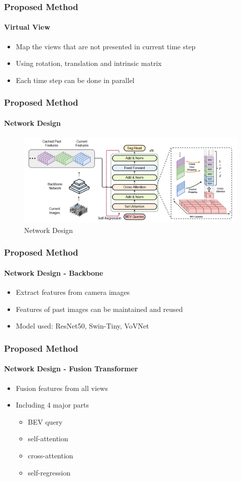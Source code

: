 \documentclass[
	12pt, %
	aspectratio=169, %
]{beamer}
\begin{document}
\begin{frame}
	\frametitle{Proposed Method}
	\framesubtitle{Virtual View}

	\begin{itemize}
		\item Map the views that are not presented in current time step
		\item Using rotation, translation and intrinsic matrix
		\item Each time step can be done in parallel
	\end{itemize}
\end{frame}

\begin{frame}
	\frametitle{Proposed Method}
	\framesubtitle{Network Design}

	\begin{figure}
		\centering
		\includegraphics[width=0.9\linewidth]{"./Images/network_design.png"}
		\caption{Network Design}
	\end{figure}
\end{frame}

\begin{frame}
	\frametitle{Proposed Method}
	\framesubtitle{Network Design - Backbone}

	\begin{itemize}
		\item Extract features from camera images
		\item Features of past images can be maintained and reused
		\item Model used: ResNet50, Swin-Tiny, VoVNet
	\end{itemize}
\end{frame}

\begin{frame}
	\frametitle{Proposed Method}
	\framesubtitle{Network Design - Fusion Transformer}

	\begin{itemize}
		\item Fusion features from all views
		\item Including 4 major parts
		\begin{itemize}
			\item BEV query
			\item self-attention
			\item cross-attention
			\item self-regression
		\end{itemize}
	\end{itemize}
\end{frame}
\end{document}
